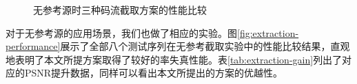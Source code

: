 \begin{figure}[!ht]
	\qquad
	\caption{无参考源时三种码流截取方案的性能比较}
	\label{fig:extraction-performance-noref}
\end{figure}

对于无参考源的应用场景，我们也做了相应的实验。图\ref{fig:extraction-performance}展示了全部八个测试序列在无参考截取实验中的性能比较结果，直观地表明了本文所提方案取得了较好的率失真性能。表\ref{tab:extraction-gain}列出了对应的PSNR提升数据，同样可以看出本文所提出的方案的优越性。

